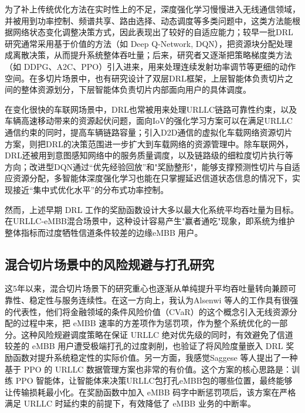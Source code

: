 为了补上传统优化方法在实时性上的不足，深度强化学习慢慢进入无线通信领域，并被用到功率控制、频谱共享、路由选择、动态调度等多类问题中，这类方法能根据网络状态变化调整决策方式，因此表现出了较好的自适应能力\cite{luong2019}；较早一批DRL研究通常采用基于价值的方法（如 Deep Q-Network, DQN），把资源块分配处理成离散决策，从而提升系统整体吞吐量\cite{luong2019, li2020}；后来，研究者又逐渐把策略梯度类方法（如 DDPG、A2C、PPO）引入进来，用来处理连续发射功率调节等更细的动作空间\cite{luong2019, hua2020}。在多切片场景中，也有研究设计了双层DRL框架，上层智能体负责切片之间的整体资源划分，下层智能体负责切片内部面向用户的具体调度\cite{setayesh2022, filali2022}。

在变化很快的车联网场景中，DRL也常被用来处理URLLC链路可靠性约束，以及车辆高速移动带来的资源起伏问题，面向IoV的强化学习方案可以在满足URLLC通信约束的同时，提高车辆链路容量\cite{yang2019iov}；引入D2D通信的虚拟化车载网络资源切片方案，则把DRL的决策范围进一步扩大到车载网络的资源管理中\cite{sun2020vehicular}。除车联网外，DRL还被用到意图感知网络中的服务质量调度\cite{nahum2024}，以及链路级的细粒度切片执行\cite{wang2022linkslice}等方向；改进型DQN通过“优先经验回放”和"奖励整形"，能够支撑预测性切片与自适应资源分配\cite{yagcioglu2026}，多智能体深度强化学习也能在只掌握延迟信道状态信息的情况下，实现接近“集中式优化水平”的分布式功率控制\cite{nasir2019}。

然而，上述早期 DRL 工作的奖励函数设计大多以最大化系统平均吞吐量为目标。在URLLC-eMBB混合场景中，这种设计容易产生"赢者通吃"现象，即系统为维护整体指标而过度牺牲信道条件较差的边缘eMBB 用户\cite{alsenwi2021}。

\subsection{混合切片场景中的风险规避与打孔研究}\label{123-ux6df7ux5408ux5207ux7247ux573aux666fux4e2dux7684ux98ceux9669ux89c4ux907fux4e0eux52a8ux6001ux6253ux5b54ux7814ux7a76}

这5年以来，混合切片场景下的研究重心也逐渐从单纯提升平均吞吐量转向兼顾可靠性、稳定性与服务连续性\cite{bennis2018}。在这一方向上，我认为Alsenwi 等人的工作具有很强的代表性\cite{alsenwi2024distributed}，他们将金融领域的条件风险价值（CVaR）的这个概念引入无线资源分配的过程中来，把 eMBB 速率的方差项作为惩罚项，作为整个系统优化的一部分\cite{alsenwi2019risk}。这种风险规避调度策略在保证 URLLC 绝对优先级的同时，有效避免了信道较差的 eMBB 用户遭受极端打孔的过度剥削，也验证了将风险度量嵌入 DRL 奖励函数对提升系统稳定性的实际价值。另一方面，我感觉Saggese 等人提出了一种基于 PPO 的 URLLC 数据管理方案\cite{saggese2021}也非常的有价值。这个方案的核心思路是：训练 PPO 智能体，让智能体来决策URLLC包打孔eMBB包的哪些位置，最终能够让传输损耗最小化。在奖励函数中加入 eMBB 码字中断惩罚项后，该方案在严格满足 URLLC 时延约束的前提下，有效降低了 eMBB 业务的中断率。

